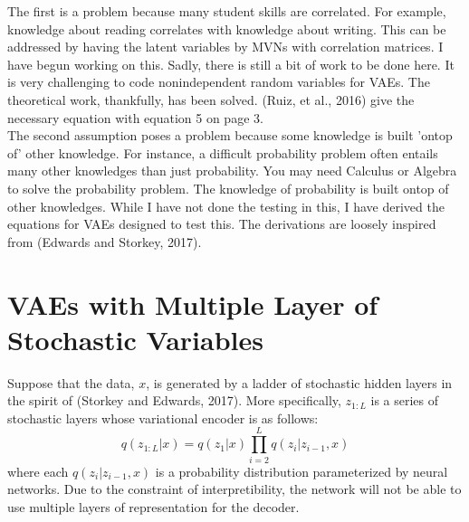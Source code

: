 \documentclass[10pt]{article}
\begin{document}
The first is a problem because many student skills are correlated.  For example, knowledge about reading correlates with knowledge about writing.  This can be addressed by having the latent variables by MVNs with correlation matrices.  I have begun working on this.  Sadly, there is still a bit of work to be done here.  It is very challenging to code nonindependent random variables for VAEs. The theoretical work, thankfully, has been solved.  (Ruiz, et al., 2016) give the necessary equation with equation 5 on page 3.    \\

The second assumption poses a problem because some knowledge is built 'ontop of' other knowledge.  For instance, a difficult probability problem often entails many other knowledges than just probability.  You may need Calculus or Algebra to solve the probability problem. The knowledge of probability is built ontop of other knowledges.  While I have not done the testing in this, I have derived the equations for VAEs designed to test this.  The derivations are loosely inspired from (Edwards and Storkey, 2017).


\section*{VAEs with Multiple Layer of Stochastic Variables}
Suppose that the data, $x$, is generated by a ladder of stochastic hidden layers in the spirit of (Storkey and Edwards, 2017).  More specifically, $z_{1:L}$ is a series of stochastic layers whose variational encoder is as follows:
\begin{equation} \label{Encoder Network}
q(z_{1:L}|x) = q(z_{1}|x) \prod_{i=2}^{L}q(z_{i}|z_{i-1},x) 
\end{equation}
where each $q(z_{i}|z_{i-1},x)$ is a probability distribution parameterized by neural networks.  Due to the constraint of interpretibility, the network will not be able to use multiple layers of representation for the decoder.  
\end{document}
